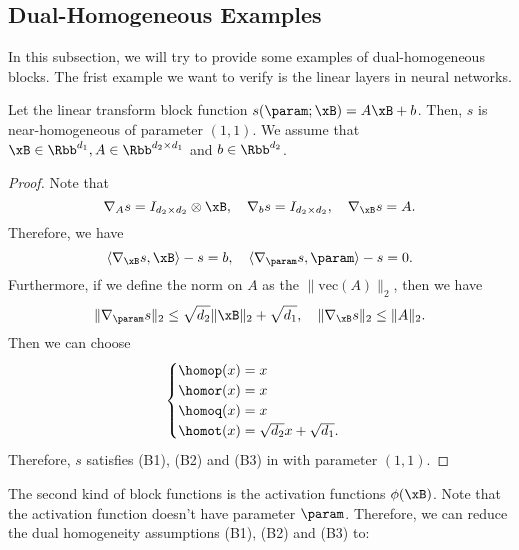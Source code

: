 \subsection{Dual-Homogeneous Examples} \label{sec:proof-dual-homo-eg}
In this subsection, we will try to provide some examples of dual-homogeneous blocks. The frist example we want to verify is the linear layers in neural networks. 


\begin{example}
\label{eg:linear-trans}
Let the linear transform block function $s(\param;\xB) = A \xB + b$. Then, $s$ is near-homogeneous of parameter $(1,1)$. We assume that $\xB\in \Rbb^{d_1}, A \in \Rbb^{d_2 \times d_1}$ and $b \in \Rbb^{d_2}$. 
\end{example}
\begin{proof}
Note that 
\[
    \nabla_A s = I_{d_2\times d_2} \otimes \xB, \quad \nabla_b s = I_{d_2 \times d_2}, \quad \nabla_{\xB} s = A. 
\]
Therefore, we have 
\[
    \langle \nabla_{\xB} s, \xB \rangle -s = b, \quad \langle \nabla_{\param} s, \param \rangle - s= 0.   
\]
Furthermore, if we define the norm on $A$ as the $\| \text{vec} (A)\|_2$, then we have 
\[
    \|\nabla_{\param} s\|_2 \le \sqrt{d_2}\| \xB \|_2 + \sqrt{d_1}, \quad \|\nabla_{\xB} s\|_2 \le \|A\|_2.  
\]
Then we can choose 
\[
   \begin{cases}
    \homop(x) = x \\ 
    \homor(x) =  x \\ 
    \homoq(x) =  x \\ 
    \homot(x) = \sqrt{d_2} x + \sqrt{d_1}.
   \end{cases}
\]
Therefore, $s$ satisfies (B1), (B2) and (B3) in  with parameter $(1,1)$. 
\end{proof}

The second kind of block functions is the activation functions $\phi(\xB)$. Note that the activation function doesn't have parameter $\param$. Therefore, we can reduce the dual homogeneity assumptions (B1), (B2) and (B3) to: 


